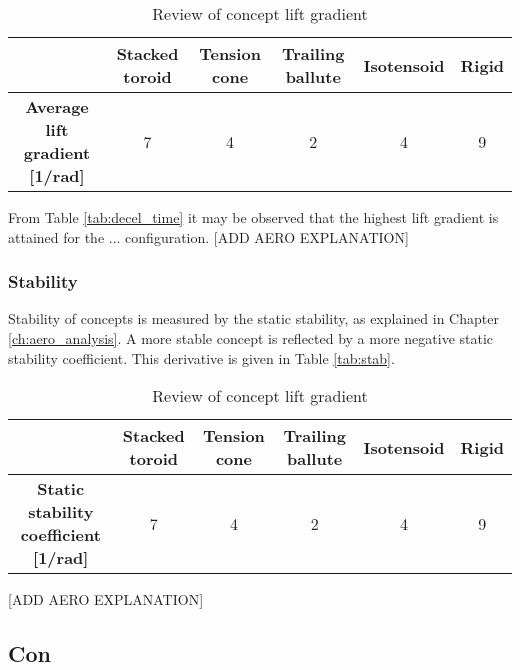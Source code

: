 \begin{table}[h]
\caption{Review of concept lift gradient}
\hspace{-20mm}
\begin{tabular}{|c|c|c|c|c|c|}
\hline
\textbf{}                          & \textbf{Stacked toroid} & \textbf{Tension cone} & \textbf{Trailing ballute} & \textbf{Isotensoid} & \textbf{Rigid} \\ \hline
\textbf{Average lift gradient {[}1/rad{]}} &\cellcolor{green!70} 7  &\cellcolor{yellow!75}  4   &\cellcolor{red!60} 2 & \cellcolor{yellow!75}      4          &\cellcolor{green!70} 9                 \\ \hline
\end{tabular}
\end{table}

From Table \ref{tab:decel_time} it may be observed that the highest lift gradient is attained for the ... configuration. [ADD AERO EXPLANATION]

\subsubsection{Stability}
Stability of concepts is measured by the static stability, as explained in Chapter \ref{ch:aero_analysis}. A more stable concept is reflected by a more negative static stability coefficient. This derivative is given in Table \ref{tab:stab}.

\begin{table}[h]
\caption{Review of concept lift gradient}
\hspace{-20mm}
\begin{tabular}{|c|c|c|c|c|c|}
\hline
\textbf{}                          & \textbf{Stacked toroid} & \textbf{Tension cone} & \textbf{Trailing ballute} & \textbf{Isotensoid} & \textbf{Rigid} \\ \hline
\textbf{Static stability coefficient {[}1/rad{]}} &\cellcolor{green!70} 7  &\cellcolor{yellow!75}  4   &\cellcolor{red!60} 2 & \cellcolor{yellow!75}      4          &\cellcolor{green!70} 9                 \\ \hline
\end{tabular}
\end{table}

[ADD AERO EXPLANATION]

\subsection{Con}

